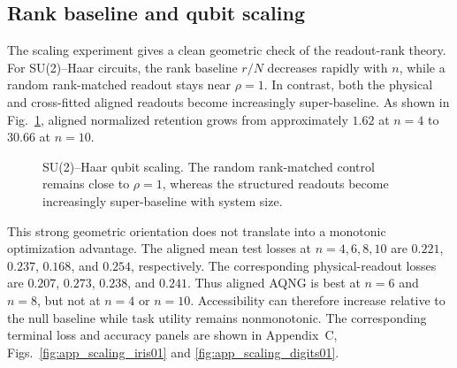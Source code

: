 \subsection{Rank baseline and qubit scaling}
The scaling experiment gives a clean geometric check of the readout-rank theory. For SU(2)--Haar circuits, the rank baseline $r/N$ decreases rapidly with $n$, while a random rank-matched readout stays near $\rho=1$. In contrast, both the physical and cross-fitted aligned readouts become increasingly super-baseline. As shown in Fig.~\ref{fig:scaling_geometry}, aligned normalized retention grows from approximately $1.62$ at $n=4$ to $30.66$ at $n=10$.

\begin{figure}[t]
\centering
{}
\caption{SU(2)--Haar qubit scaling. The random rank-matched control remains close to $\rho=1$, whereas the structured readouts become increasingly super-baseline with system size.}
\label{fig:scaling_geometry}
\end{figure}

This strong geometric orientation does not translate into a monotonic optimization advantage. The aligned mean test losses at $n=4,6,8,10$ are $0.221$, $0.237$, $0.168$, and $0.254$, respectively. The corresponding physical-readout losses are $0.207$, $0.273$, $0.238$, and $0.241$. Thus aligned AQNG is best at $n=6$ and $n=8$, but not at $n=4$ or $n=10$. Accessibility can therefore increase relative to the null baseline while task utility remains nonmonotonic. The corresponding terminal loss and accuracy panels are shown in Appendix~C, Figs.~\ref{fig:app_scaling_iris01} and \ref{fig:app_scaling_digits01}.

